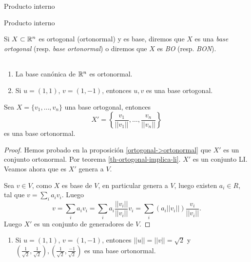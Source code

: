 \begin{chapter}{Producto interno}
\begin{section}{Producto interno}
        \begin{definicion} Si $X \subset \mathbb R^n$ es ortogonal (ortonormal) y es base, diremos que $X$ es una \textit{base ortogonal} (resp. \textit{base ortonormal}) o diremos que $X$ es \textit{BO} (resp. \textit{BON}).
        \end{definicion}
        
        \begin{ejemplo*} ${}^{}$
            \begin{enumerate}
                \item La base canónica de $\mathbb R^n$ es ortonormal. 
                \item Si $u=(1,1)$, $v=(1,-1)$, entonces $u,v$ es una base ortogonal.  
            \end{enumerate}
        \end{ejemplo*}
        
        \begin{proposicion} Sea $ X = \{v_1,\ldots,v_n\}$ una base ortogonal, entonces 
            \begin{equation*}
                X' = \left\{\frac{v_1}{||v_1||},\ldots,\frac{v_n}{||v_n||} \right\}
            \end{equation*}
            es una base ortonormal.
        \end{proposicion}
        \begin{proof}
            Hemos probado en la proposición \ref{ortogonal->ortonormal} que $X'$ es un conjunto ortonormal.  Por  teorema \ref{th-ortogonal-implica-li}. $X'$ es un conjunto LI.   Veamos ahora que es $X'$ genera a $V$. 
            
            Sea $v \in V$, como $X$  es base de  $V$, en particular genera a $V$, luego existen $a_i \in R$, tal que  $v = \sum_i a_i v_i$. Luego
            $$
            v = \sum_i a_i v_i = \sum_i a_i \frac{||v_i||}{||v_i||} v_i = \sum_i (a_i ||v_i||) \frac{v_i}{||v_i||}.
            $$
            Luego $X'$ es un conjunto de generadores de $V$. 
        \end{proof}
        \begin{ejemplo*} 
            \begin{enumerate}
                \item Si $u=(1,1)$, $v=(1,-1)$, entonces $||u||=||v|| = \sqrt{2}$ y $(\frac{1}{\sqrt{2}},\frac{1}{\sqrt{2}}),(\frac{1}{\sqrt{2}},\frac{-1}{\sqrt{2}})$ es una base ortonormal.  
            \end{enumerate}
        \end{ejemplo*}
        

\end{section}
\end{chapter}
